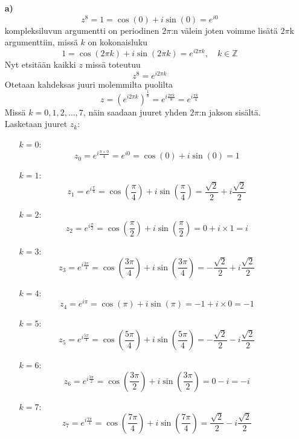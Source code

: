 \documentclass{article}
\begin{document}
\begin{itemize}
    \item[\textbf{a)}]
    \[ 
        z^8 = 1 = \cos(0) + i\sin(0) = e^{i0}
    \]
    kompleksiluvun argumentti on periodinen $2\pi$:n välein joten voimme lisätä $2\pi$k argumenttiin, missä $k$ on kokonaisluku
    \[
        1 = \cos(2\pi k) + i\sin(2\pi k) = e^{i2\pi k}, \quad k \in \mathbb{Z}
    \]
    Nyt etsitään kaikki $z$ missä toteutuu
    \[
        z^8 = e^{i2\pi k}
    \]
    Otetaan kahdeksas juuri molemmilta puolilta
    \[
        z = \left( e^{i2\pi k} \right)^{\frac{1}{8}} = e^{i\frac{2\pi k}{8}} = e^{i\frac{\pi k}{4}}
    \]
    Missä \( k = 0, 1, 2, \dots, 7 \), näin saadaan juuret yhden $2\pi$:n jakson sisältä.\newline
    Lasketaan juuret $z_k$:
    \begin{itemize}
        \item[] $k = 0$:
        \[
            z_0 = e^{i\frac{\pi \times 0}{4}} = e^{i0} = \cos(0) + i\sin(0) = 1
        \]
        \item[] $k = 1$:
        \[
            z_1 = e^{i\frac{\pi}{4}} = \cos\left( \frac{\pi}{4} \right) + i\sin\left( \frac{\pi}{4} \right) = \frac{\sqrt{2}}{2} + i\frac{\sqrt{2}}{2}
        \]
        \item[] $k = 2$:
        \[
            z_2 = e^{i\frac{\pi}{2}} = \cos\left( \frac{\pi}{2} \right) + i\sin\left( \frac{\pi}{2} \right) = 0 + i \times 1 = i
        \]
        \item[] $k = 3$:
        \[
            z_3 = e^{i\frac{3\pi}{4}} = \cos\left( \frac{3\pi}{4} \right) + i\sin\left( \frac{3\pi}{4} \right) = -\frac{\sqrt{2}}{2} + i\frac{\sqrt{2}}{2}
        \]
        \item[] $k = 4$:
        \[
            z_4 = e^{i\pi} = \cos(\pi) + i\sin(\pi) = -1 + i \times 0 = -1
        \]
        \item[] $k = 5$:
        \[
            z_5 = e^{i\frac{5\pi}{4}} = \cos\left( \frac{5\pi}{4} \right) + i\sin\left( \frac{5\pi}{4} \right) = -\frac{\sqrt{2}}{2} - i\frac{\sqrt{2}}{2}
        \]
        \item[] $k = 6$:
        \[
            z_6 = e^{i\frac{3\pi}{2}} = \cos\left( \frac{3\pi}{2} \right) + i\sin\left( \frac{3\pi}{2} \right) = 0 - i = -i
        \]
        \item[] $k = 7$:
        \[
            z_7 = e^{i\frac{7\pi}{4}} = \cos\left( \frac{7\pi}{4} \right) + i\sin\left( \frac{7\pi}{4} \right) = \frac{\sqrt{2}}{2} - i\frac{\sqrt{2}}{2}
        \]
    \end{itemize}








\end{itemize}
\end{document}
